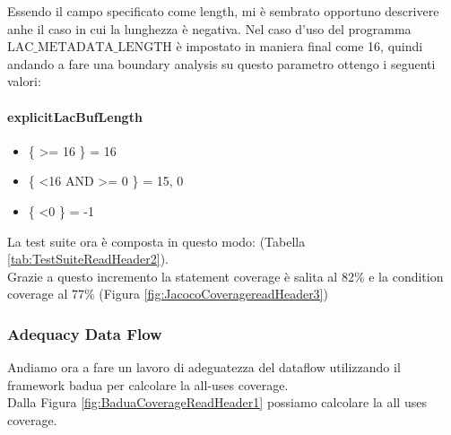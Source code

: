\documentclass[10pt, a4paper]{article}
\begin{document}
Essendo il campo specificato come length, mi è sembrato opportuno descrivere anhe il caso in cui la lunghezza è negativa.
Nel caso d'uso del programma $\text{LAC\_METADATA\_LENGTH}$ è impostato in maniera final come 16, quindi andando a fare una boundary
analysis su questo parametro ottengo i seguenti valori:

\paragraph{explicitLacBufLength}
\begin{itemize}
  \item \{ \textgreater= 16 \} = 16
  \item \{ \textless 16 AND \textgreater= 0 \} = 15, 0
  \item \{ \textless 0 \} = -1
\end{itemize}
La test suite ora è composta in questo modo: (Tabella \ref{tab:TestSuiteReadHeader2}). \\
Grazie a questo incremento la statement coverage è salita al 82\%
e la condition coverage al 77\% (Figura \ref{fig:JacocoCoveragereadHeader3})



\subsubsection{Adequacy Data Flow}

Andiamo ora a fare un lavoro di adeguatezza del dataflow utilizzando il framework badua per calcolare la all-uses coverage. \\
Dalla Figura \ref{fig:BaduaCoverageReadHeader1} possiamo calcolare la all uses coverage. \\
\end{document}
